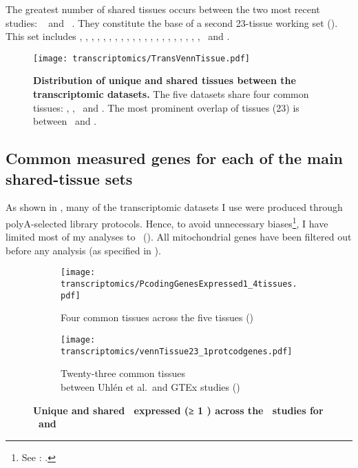 The greatest number of shared tissues occurs
between the two most recent studies:
\uhlen~ and \gtex~.
They constitute the base of a second 23-tissue working set (\setTwo).
This set includes
\Adipose, \Adrenal, \Bladder, \Cortex, \hcolon, \Esophagus,
\Fallopian, \heart, \kidney, \liver, \lung, \Ovary, \Pancreas, \Prostate,
\salivary, \skeletal, \skin, \intestine, \spleen, \stomach, \testis,
\thyroid\ and \uterus.

\begin{figure}[!htbp]
\texttt{[image: transcriptomics/TransVennTissue.pdf]}\centering
\caption[Distribution of unique and shared tissues between the
transcriptomic datasets]
{\label{fig:VennStudiesT}\textbf{Distribution of unique and shared tissues
between the transcriptomic datasets.} The five datasets share four
common tissues: \heart, \kidney, \liver\ and \testis.
The most prominent overlap of tissues (23) is between \uhlen\ and \gtex.
}
\end{figure}

\subsection{Common measured genes for each of the main shared-tissue sets\quad}%
\label{subsec:transGeneOverlap}
\vspace*{-7mm}
As shown in ,
many of the transcriptomic datasets I use were produced through
polyA-selected library protocols.
Hence,
to avoid unnecessary biases\footnote{See
: .},
I have limited most of my analyses to \pcgs\ ().
All mitochondrial genes have been filtered out before any \treps{} analysis
(as specified in ).

\begin{figure}[!hptb]
    \centering
    \begin{subfigure}[b]{\textwidth}
        \centering \texttt{[image: transcriptomics/PcodingGenesExpressed1\_4tissues.pdf]}
        \caption{Four common tissues across the five tissues (\setOne)}\label{fig:ExpGenePcoding1}
    \end{subfigure}

    \begin{subfigure}[b]{\textwidth}
        \centering \texttt{[image: transcriptomics/vennTissue23\_1protcodgenes.pdf]}
        \caption{Twenty-three common tissues\\ between Uhlén et al.\
        and GTEx studies (\setTwo)}\label{fig:ExpGenePcoding1_t23}
    \end{subfigure}
    \caption[Unique and shared \pcgs\ expressed (≥1 \FPKM) across RNA-Seq studies]%
    {\textbf{Unique and shared \pcgs\ expressed (≥ 1 \FPKM) across the \Rnaseq\ studies
    for \setOne\ and \setTwo}}
\end{figure}

